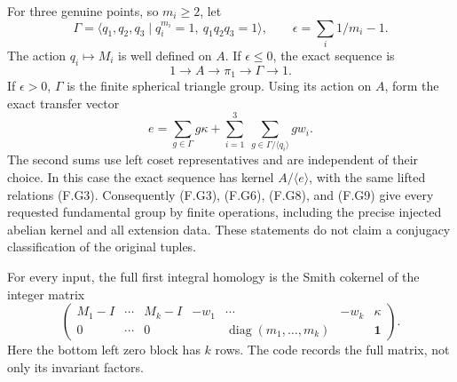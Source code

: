 For three genuine points, so $m_i\ge2$, let
\[
 \Gamma=\langle q_1,q_2,q_3\mid q_i^{m_i}=1,
                         \ q_1q_2q_3=1\rangle,
 \qquad \epsilon=\sum_i1/m_i-1.                           \tag{F.G7}
\]
The action $q_i\mapsto M_i$ is well defined on $A$.
If $\epsilon\le0$, the exact sequence is
\[
                    1\longrightarrow A\longrightarrow\pi_1
                         \longrightarrow\Gamma\longrightarrow1. 
 \tag{F.G8}
\]
If $\epsilon>0$, $\Gamma$ is the finite spherical triangle group.
Using its action on $A$, form the exact transfer vector
\[
 e=\sum_{g\in\Gamma}g\kappa+
       \sum_{i=1}^3\ \sum_{g\in\Gamma/\langle q_i\rangle}g w_i.
 \tag{F.G9}
\]
The second sums use left coset representatives and are independent
of their choice.  In this case the exact sequence has kernel
$A/\langle e\rangle$, with the same lifted relations (F.G3).
Consequently (F.G3), (F.G6), (F.G8), and (F.G9) give every requested
fundamental group by finite operations, including the precise
injected abelian kernel and all extension data.  These statements
do not claim a conjugacy classification of the original tuples.

For every input, the full first integral homology is the Smith
cokernel of the integer matrix
\[
 \begin{pmatrix}
 M_1-I&\cdots&M_k-I&-w_1&\cdots&-w_k&\kappa\\
 0&\cdots&0&&\operatorname{diag}(m_1,\ldots,m_k)&&\boldsymbol1
 \end{pmatrix}.                                           \tag{F.G10}
\]
Here the bottom left zero block has $k$ rows.  The code records
the full matrix, not only its invariant factors.

